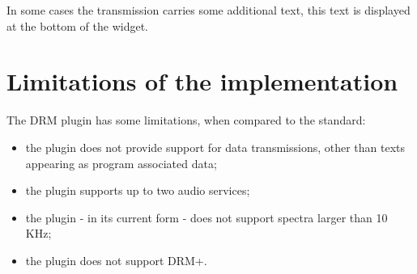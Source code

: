 \documentclass[10pt]{article}
\begin{document}
In some cases the transmission carries some additional text, this text is
displayed at the bottom of the widget.
\section{Limitations of the implementation}
The DRM plugin has some limitations, when compared to the standard:
\begin{itemize}
\item the plugin does not provide support for data transmissions, other than
texts appearing as program associated data;
\item the plugin supports up to two audio services;
\item the plugin - in its current form - does not support spectra larger
than 10 KHz;
\item the plugin does not support DRM+.
\end{itemize}
\end{document}
